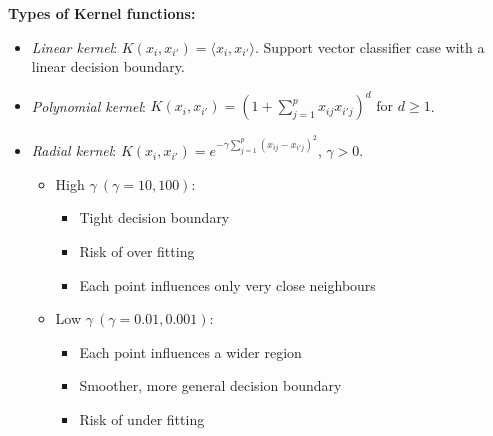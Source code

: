 \documentclass[11pt]{article}
\begin{document}
\noindent \textbf{Types of Kernel functions:}
\begin{itemize}
    \item \textit{Linear kernel}: $K(x_i, x_{i'}) = \langle x_i, x_{i'} \rangle$. Support vector classifier case with a linear decision boundary.
    \item \textit{Polynomial kernel}: $K(x_i, x_{i'}) = (1 + \sum_{j=1}^{p}{x_{ij}x_{{i'}j}})^d \text{ for } d \geq 1$.
    \item \textit{Radial kernel}: $K(x_i, x_{i'}) = e^{-\gamma\sum_{j=1}^{p}(x_{ij} - x_{{i'}j})^2}$, $\gamma > 0$.
        \begin{itemize}
            \item High $\gamma \: (\gamma =10,100)$:
                \begin{itemize}
                    \item Tight decision boundary
                    \item Risk of over fitting
                    \item Each point influences only very close neighbours
                \end{itemize}
            \item Low $\gamma \: (\gamma=0.01,0.001)$:
                \begin{itemize}
                    \item Each point influences a wider region
                    \item Smoother, more general decision boundary
                    \item Risk of under fitting
                \end{itemize}
        \end{itemize}
\end{itemize}
\end{document}
